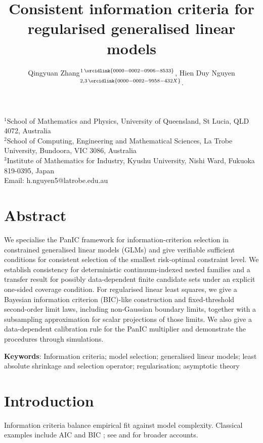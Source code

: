 \documentclass[12pt]{article}
\newenvironment{bluechange}{\begingroup\color[rgb]{0.00,0.00,1.00}}{\endgroup}
\theoremstyle{remark}
\theoremstyle{plain}
\begin{document}
\title{Consistent information criteria for regularised generalised linear models}
\author{ Qingyuan Zhang$^{1\,\orcidlink{0000-0002-0906-8533}}$, Hien Duy Nguyen$^{2,3\,\orcidlink{0000-0002-9958-432X}}$.}
\date{}

\maketitle

\noindent\footnotesize{$^{1}$School of Mathematics and Physics, University of Queensland, St Lucia, QLD 4072, Australia\\
$^{2}$School of Computing, Engineering and Mathematical Sciences, La Trobe University, Bundoora, VIC 3086, Australia\\
$^{3}$Institute of Mathematics for Industry, Kyushu University, Nishi Ward, Fukuoka 819-0395, Japan\\
Email: h.nguyen5@latrobe.edu.au}

\doublespacing
\section*{Abstract}
\begin{bluechange}
We specialise the PanIC framework for information-criterion selection in constrained generalised linear models (GLMs) and give verifiable sufficient conditions for consistent selection of the smallest risk-optimal constraint level. We establish consistency for deterministic continuum-indexed nested families and a transfer result for possibly data-dependent finite candidate sets under an explicit one-sided coverage condition. For regularised linear least squares, we give a Bayesian information criterion (BIC)-like construction and fixed-threshold second-order limit laws, including non-Gaussian boundary limits, together with a subsampling approximation for scalar projections of those limits. We also give a data-dependent calibration rule for the PanIC multiplier and demonstrate the procedures through simulations.
\end{bluechange}

\noindent \textbf{Keywords}: Information criteria; model selection; generalised linear models; least absolute shrinkage and selection operator; regularisation; asymptotic theory



\section{Introduction}
Information criteria balance empirical fit against model complexity. Classical examples include AIC \citep{akaike_new_1974} and BIC \citep{schwarz_estimating_1978}; see \citet{mcquarrie_regression_1998} and \citet{buhlmann_statistics_2011} for broader accounts.
\end{document}
